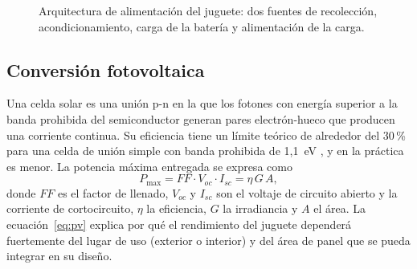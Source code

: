 \documentclass[11pt]{article}
\begin{document}
\begin{figure}[htbp]
\centering
{}
\caption{Arquitectura de alimentación del juguete: dos fuentes de recolección,
acondicionamiento, carga de la batería y alimentación de la carga.}
\label{fig:arq}
\end{figure}
 
\subsection{Conversión fotovoltaica}
Una celda solar es una unión p-n en la que los fotones con energía superior a
la banda prohibida del semiconductor generan pares electrón-hueco que producen
una corriente continua. Su eficiencia tiene un límite teórico de alrededor del
30\,\% para una celda de unión simple con banda prohibida de 1{,}1~eV
\cite{shockley1961}, y en la práctica es menor. La potencia máxima entregada
se expresa como
\begin{equation}
  P_{\max} = FF \cdot V_{oc} \cdot I_{sc} = \eta \, G \, A ,
  \label{eq:pv}
\end{equation}
donde $FF$ es el factor de llenado, $V_{oc}$ y $I_{sc}$ son el voltaje de
circuito abierto y la corriente de cortocircuito, $\eta$ la eficiencia, $G$ la
irradiancia y $A$ el área. La ecuación~\eqref{eq:pv} explica por qué el
rendimiento del juguete dependerá fuertemente del lugar de uso (exterior o
interior) y del área de panel que se pueda integrar en su diseño.
 
\end{document}

